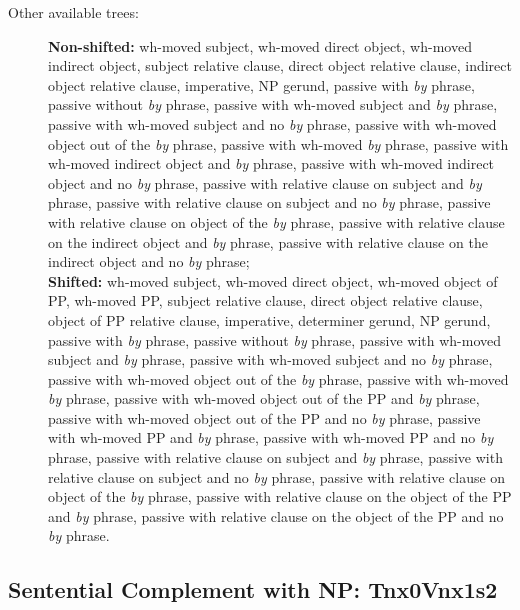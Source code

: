 \begin{description}
\item[Other available trees:] 
{\bf Non-shifted:}  wh-moved subject, wh-moved direct object, 
wh-moved indirect object, subject relative clause, direct object relative
clause, indirect object relative clause, imperative, NP
gerund, passive with {\it by} phrase, passive without {\it by} phrase, passive
with wh-moved subject and {\it by} phrase, passive with wh-moved subject and no
{\it by} phrase, passive with wh-moved object out of the {\it by} phrase,
passive with wh-moved {\it by} phrase, passive with wh-moved indirect object
and {\it by} phrase, passive with wh-moved indirect object and no {\it by}
phrase,  passive with relative clause on subject and {\it by} phrase, passive
with relative clause on subject and no {\it by} phrase, passive with relative
clause on object of the {\it by} phrase, passive with relative clause on the
indirect object and {\it by} phrase, passive with relative clause on the
indirect object and no {\it by} phrase; \\
{\bf Shifted:} wh-moved subject, wh-moved direct object, 
wh-moved object of PP, wh-moved PP, subject relative clause, direct object
relative clause, object of PP relative clause, imperative, determiner gerund,
NP gerund, passive with {\it by} phrase, passive without {\it by} phrase,
passive with wh-moved subject and {\it by} phrase, passive with wh-moved
subject and no {\it by} phrase, passive with wh-moved object out of the {\it
by} phrase, passive with wh-moved {\it by} phrase, passive with wh-moved object
out of the PP and {\it by} phrase, passive with wh-moved object out of the PP
and no {\it by} phrase, passive with wh-moved PP and {\it by} phrase, passive
with wh-moved PP and no {\it by} phrase, passive with relative clause on
subject and {\it by} phrase, passive with relative clause on subject and no
{\it by} phrase, passive with relative clause on object of the {\it by} phrase,
passive with relative clause on the object of the PP and {\it by} phrase,
passive with relative clause on the object of the PP and no {\it by} phrase.


\end{description}




\subsection{Sentential Complement with NP: Tnx0Vnx1s2} 
\label{nx0Vnx1s2-family}


